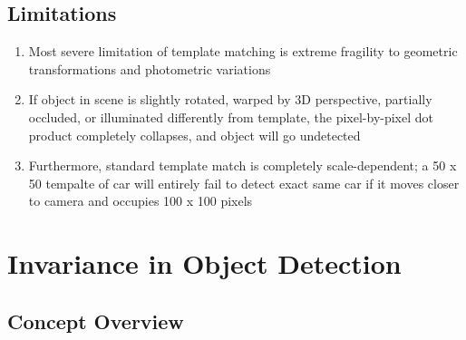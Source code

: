 \documentclass[12pt]{article}
\begin{document}
\subsection{Limitations}

\begin{enumerate}
    \item Most severe limitation of template matching is extreme fragility to geometric transformations and photometric variations
    \item If object in scene is slightly rotated, warped by 3D perspective, partially occluded, or illuminated differently from template, the pixel-by-pixel dot product completely collapses, and object will go undetected
    \item Furthermore, standard template match is completely scale-dependent; a 50 x 50 tempalte of car will entirely fail to detect exact same car if it moves closer to camera and occupies 100 x 100 pixels
\end{enumerate}


\section{Invariance in Object Detection}

\subsection{Concept Overview}
\end{document}
